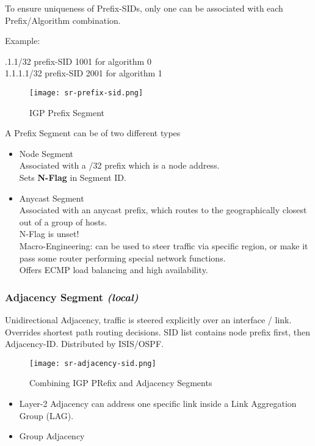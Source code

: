 To ensure uniqueness of Prefix-SIDs, only one can be associated with each Prefix/Algorithm combination.

Example:

\noindent
{}.1.1/32 prefix-SID 1001 for algorithm 0 \\ 
1.1.1.1/32 prefix-SID 2001 for algorithm 1 \\
\rmfamily

\begin{figure}
    \centering
    \texttt{[image: sr-prefix-sid.png]}
    \caption{IGP Prefix Segment}
\end{figure}

\vspace{5mm}
\noindent
A Prefix Segment can be of two different types
\begin{itemize}
    \item Node Segment \\
    Associated with a /32 prefix which is a node address. \\
    Sets \textbf{N-Flag} in Segment ID.
    \item Anycast Segment \\
    Associated with an anycast prefix, which routes to the geographically closest out of a group of hosts. \\
    N-Flag is unset! \\ 
    Macro-Engineering: can be used to steer traffic via specific region, or make it pass some router performing special network functions. \\
    Offers ECMP load balancing and high availability.
\end{itemize}

\subsubsection{Adjacency Segment \emph{(local)}}
Unidirectional Adjacency, traffic is steered explicitly over an interface / link. 
Overrides shortest path routing decisions.
SID list contains node prefix first, then Adjacency-ID. 
Distributed by ISIS/OSPF.

\begin{figure}
    \centering
    \texttt{[image: sr-adjacency-sid.png]}
    \caption{Combining IGP PRefix and Adjacency Segments}
\end{figure}

\begin{itemize}
    \item Layer-2 Adjacency can address one specific link inside a Link Aggregation Group (LAG). 
    \item Group Adjacency
\end{itemize} 

